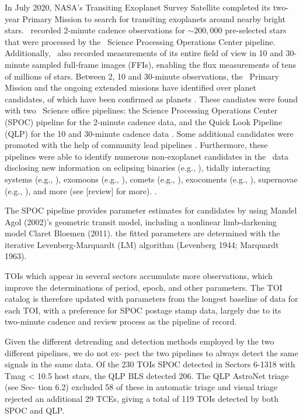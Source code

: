 \documentclass[linenumbers,floatfix,ApJL,twocolumn]{aastex631}
\begin{document}
In July 2020, NASA’s Transiting Exoplanet Survey Satellite \citep{Ricker:2015:JATIS} completed its two-year Primary Mission to search for transiting exoplanets around nearby bright stars.
\tess\ recorded 2-minute cadence observations for $\sim200,000$ pre-selected stars that were processed by the \tess\ Science Processing Operations Center \citep{Jenkins:2016:SPIE} pipeline.
Additionally, \tess\ also recorded measurements of its entire field of view in 10 and 30-minute sampled full-frame images (FFIs), enabling the flux measurements of tens of millions of stars.
Between 2, 10 and 30-minute observations, the \tess\ Primary Mission and the ongoing extended missions have identified over \red{$\numTessCandidates$} planet candidates, \red{$\numTessPlanets$} of which have been confirmed as planets \citep{Stassun:2018:AJ, Stassun:2019:AJ, Guerrero:2021:ApJS, Guerrero:2021:AAS}.
These candiates were found with two \tess\ Science office pipelines: the Science Processing Operations Center (SPOC) pipeline for the 2-minute cadence data, and the Quick Look Pipeline (QLP) for the 10 and 30-minute cadence data \citep{Guerrero:2021:ApJS}.
Some additional candidates were promoted with the help of community lead pipelines \citep{Guerrero:2021:ApJS}.
Furthermore, these pipelines were able to identify numerous non-exoplanet candidates in the \tess\ data disclosing new information on eclipsing binaries (e.g., ), tidally interacting systems (e.g., ), exomoons (e.g., ), comets (e.g., ),  exocoments (e.g., ), supernovae (e.g., ), and more (see [review] for more). .


The SPOC pipeline provides parameter estimates for candidates by using Mandel Agol (2002)'s geometric transit model, including a nonlinear limb-darkening model Claret Bloemen (2011).  the fitted parameters are determined with the iterative Levenberg-Marquardt (LM) algorithm (Levenberg 1944; Marquardt 1963).


TOIs which appear in several sectors accumulate more observations, which improve the determinations of period, epoch, and other parameters. The TOI catalog is therefore updated with parameters from the longest baseline of data for each TOI, with a preference for SPOC postage stamp data, largely due to its two-minute cadence and review process as the pipeline of record.

Given the different detrending and detection methods employed by the two different pipelines, we do not ex- pect the two pipelines to always detect the same signals in the same data. Of the 230 TOIs SPOC detected in Sectors 6-1318 with Tmag < 10.5 host stars, the QLP BLS detected 206. The QLP AstroNet triage (see Sec- tion 6.2) excluded 58 of these in automatic triage and visual triage rejected an additional 29 TCEs, giving a total of 119 TOIs detected by both SPOC and QLP.
\end{document}
